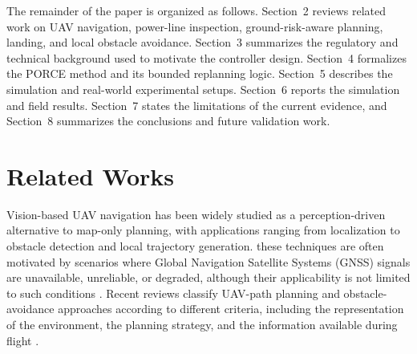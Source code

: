 \documentclass[electronics,article,submit,moreauthors]{Definitions/mdpi}
\DeclareRobustCommand{\deleted}[1]{}%
\DeclareRobustCommand{\added}[1]{#1}%
\DeclareRobustCommand{\deleted}[1]{\textcolor{black}{\sout{#1}}}
\DeclareRobustCommand{\added}[1]{\textcolor{green!50!black}{#1}}
\def\deleted#1{}%
\def\added#1{#1}%
\begin{document}
\added{The remainder of the paper is organized as follows. Section~2 reviews related work on UAV navigation, power-line inspection, ground-risk-aware planning, landing, and local obstacle avoidance. Section~3 summarizes the regulatory and technical background used to motivate the controller design. Section~4 formalizes the PORCE method and its bounded replanning logic. Section~5 describes the simulation and real-world experimental setups. Section~6 reports the simulation and field results. Section~7 states the limitations of the current evidence, and Section~8 summarizes the conclusions and future validation work.}


\section{Related Works}
Vision-based UAV navigation has been widely studied as a perception-driven alternative to map-only planning, with applications ranging from localization to obstacle detection and local trajectory generation. \deleted{Altough} these techniques are often motivated by scenarios where Global Navigation Satellite Systems (GNSS) signals are unavailable, unreliable, or degraded,\deleted{the literature has demonstrated that vision based approaches are} \added{although their applicability is} not limited to such conditions \cite{arafat2023vision,huang2025investigation}. \added{Recent reviews classify UAV-path planning and obstacle-avoidance approaches according to different criteria, including the representation of the environment, the planning strategy, and the information available during flight \cite{debnath2024review, merei2025survey, meng2025advances}.}
\end{document}
